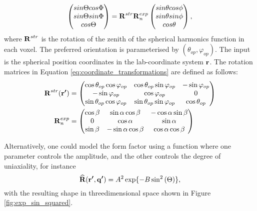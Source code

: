 \begin{equation}\label{eq:coordinate_transformations}
    \begin{pmatrix}
        sin \Theta cos \Phi \\
        sin \Theta sin \Phi \\
        cos \Theta
    \end{pmatrix}
    = \bm{\mathrm{R}}^{str} \bm{\mathrm{R}}_{n}^{exp}
    \begin{pmatrix}
        sin \theta cos \phi \\
        sin \theta sin \phi \\
        cos \theta
    \end{pmatrix},
\end{equation}
\noindent
where $\bm{\mathrm{R}}^{str}$ is the rotation of the zenith of the spherical harmonics function in each voxel. The preferred orientation is parameterised by $(\theta_{op}, \varphi_{op})$.
The input is the spherical position coordinates in the lab-coordinate system $\bm{\mathrm{r}}$.
The rotation matrices in Equation \eqref{eq:coordinate_transformations} are defined as follows:
\begin{equation}
    \begin{split}
        \bm{\mathrm{R}}^{str}(\bm{\mathrm{r'}}) &=
        \begin{pmatrix}
            \cos\theta_{op} \cos\varphi_{op} & \cos\theta_{op} \sin\varphi_{op} & -\sin\varphi_{op}  \\
            -\sin\varphi_{op}            & \cos\varphi_{op}             & 0           \\
            \sin\theta_{op} \cos\varphi_{op} & \sin\theta_{op} \sin\varphi_{op} & \cos\theta_{op}
        \end{pmatrix}\\
        \bm{\mathrm{R}}_{n}^{exp} &=
        \begin{pmatrix}
            \cos \beta & \sin \alpha \cos \beta & -\cos\alpha \sin\beta \\
            0          & \cos \alpha            & \sin \alpha           \\
            \sin\beta  & - \sin\alpha \cos\beta & \cos\alpha \cos\beta
        \end{pmatrix}
    \end{split}
\end{equation}

Alternatively, one could model the form factor using a function where one parameter controls the amplitude, and the other controls the degree of uniaxiality, for instance
\begin{equation}\label{eq:exp_sin_squared}
    \vectorBU{\widehat{R}}(\vectorBU{r'}, \vectorBU{q'}) = A^{2} \exp\{-B \sin^{2}\left( \Theta \right) \}, %
\end{equation}
with the resulting shape in threedimensional space shown in Figure \ref{fig:exp_sin_squared}.

